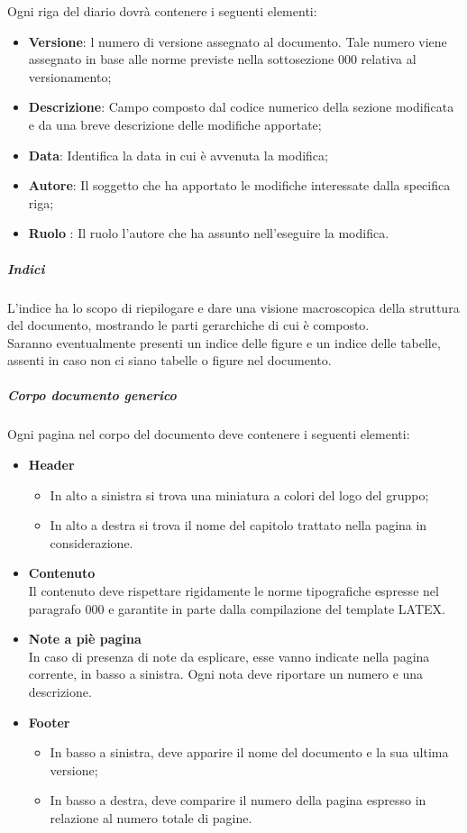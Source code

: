 					Ogni riga del diario dovrà contenere i seguenti elementi: \\
					\begin{itemize}
						\item\textbf{Versione}: l numero di versione assegnato al documento. Tale numero viene assegnato in base alle norme previste nella sottosezione 000 relativa al versionamento;
						\item\textbf{Descrizione}: Campo composto dal codice numerico della sezione modificata e da una breve descrizione delle modifiche apportate;
						\item\textbf{Data}: Identifica la data in cui è avvenuta la modifica;
						\item\textbf{Autore}: Il soggetto che ha apportato le modifiche interessate dalla specifica riga;
						\item\textbf{Ruolo} : Il ruolo l’autore che ha assunto nell’eseguire la modifica.
					\end{itemize}
				\subparagraph{Indici}
					L’indice ha lo scopo di riepilogare e dare una visione macroscopica della struttura del documento, mostrando le parti gerarchiche di cui è composto. \\
					Saranno eventualmente presenti un indice delle figure e un indice delle tabelle, assenti in caso non ci siano tabelle o figure nel documento.
				\subparagraph{Corpo documento generico}
					Ogni pagina nel corpo del documento deve contenere i seguenti elementi:\\
					\begin{itemize}
						\item\textbf{Header}
							\begin{itemize} 
								\item In alto a sinistra si trova una miniatura a colori del logo del gruppo;
								\item In alto a destra si trova il nome del capitolo trattato nella pagina in considerazione.
							\end{itemize}
						\item\textbf{Contenuto} \\
							Il contenuto deve rispettare rigidamente le norme tipografiche espresse nel paragrafo 000 e garantite in parte dalla compilazione del template LATEX.
						\item\textbf{Note a piè pagina} \\
							In caso di presenza di note da esplicare, esse vanno indicate nella pagina corrente, in basso a sinistra. Ogni nota deve riportare un numero e una descrizione.
						\item\textbf{Footer}
							\begin{itemize} 
								\item In basso a sinistra, deve apparire il nome del documento e la sua ultima versione;
								\item In basso a destra, deve comparire il numero della pagina espresso in relazione al numero totale di pagine.
							\end{itemize}
					\end{itemize}
